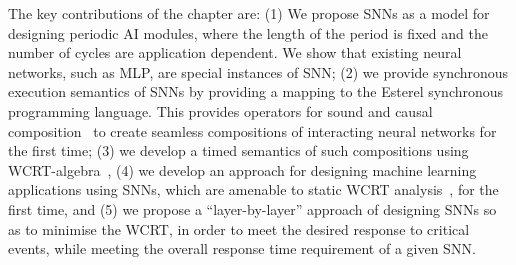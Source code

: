 The key contributions of the chapter are: (1) We propose \acfp{SNN} as a model for designing periodic 
AI modules, where the length of the period is fixed and the number of cycles are application dependent.
We show that existing neural networks, such as \ac{MLP}, are special instances of \ac{SNN};
(2) we provide synchronous execution semantics of \acp{SNN} by providing a mapping to the 
Esterel synchronous programming language. This provides operators for sound and causal composition~\cite{benveniste2003synchronous} to 
create seamless compositions of interacting neural networks for the first time; (3) we develop a 
timed semantics of such compositions using \ac{WCRT}-algebra~\cite{wang2017timing}, (4) we
 develop an approach for designing machine learning applications using \acp{SNN}, which are amenable to
  static \acf{WCRT} analysis~\cite{roop2009tight}, for the first time, and (5) we propose a ``layer-by-layer'' approach of 
 designing \acp{SNN} so as to minimise the \ac{WCRT}, in order to meet the desired response to 
critical events, while meeting the overall response time requirement of a given \ac{SNN}. 



